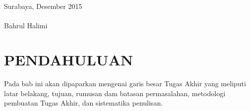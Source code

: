 \documentclass{ta-its}
\begin{document}
        \hfill Surabaya, Desember 2015 \\ \\
        
        
        \hfill Bahrul Halimi

        \cleardoublepage %

    \tableofcontents %
    \listoftables %
    \listoffigures %
    \lstlistoflistings %

\mainmatter %
    \chapter{PENDAHULUAN}
        Pada bab ini akan dipaparkan mengenai garis besar Tugas Akhir yang meliputi latar belakang, tujuan, rumusan dam batasan permasalahan, metodologi pembuatan Tugas Akhir, dan sistematika penulisan.
\end{document}
